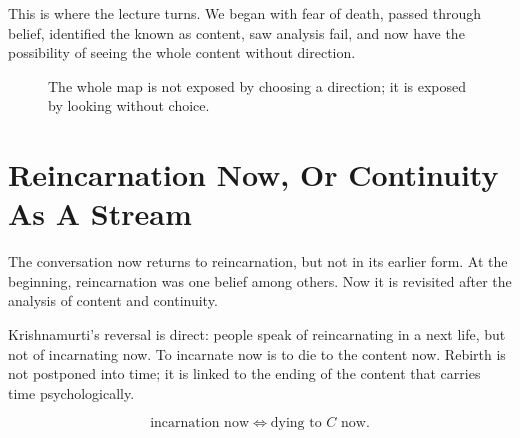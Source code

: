 This is where the lecture turns. We began with fear of death, passed through belief, identified the known as content, saw analysis fail, and now have the possibility of seeing the whole content without direction.

\begin{figure}
\centering
{}
\caption{The whole map is not exposed by choosing a direction; it is exposed by looking without choice.}
\end{figure}

\section{Reincarnation Now, Or Continuity As A Stream}

The conversation now returns to reincarnation, but not in its earlier form. At the beginning, reincarnation was one belief among others. Now it is revisited after the analysis of content and continuity.

Krishnamurti's reversal is direct: people speak of reincarnating in a next life, but not of incarnating now. To incarnate now is to die to the content now. Rebirth is not postponed into time; it is linked to the ending of the content that carries time psychologically.

\begin{equation}
\text{incarnation now}
\Longleftrightarrow
\text{dying to } C \text{ now}.
\end{equation}

